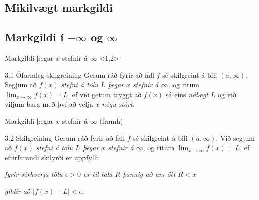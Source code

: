 \documentclass[icelandic,a4paper,12pt]{article}
\begin{document}
\begin{frame}
	\maketitle
\end{frame}

\subsection*{Mikilvægt markgildi}



\subsection*{Markgildi í $-\infty$ og $\infty$}
\begin{frame}{Markgildi þegar $x$ stefnir á $\infty$}
  {<1,2>}
\pause
 \begin{block}{3.1 Óformleg skilgreining}
 Gerum ráð fyrir að fall $f$ sé
skilgreint á bili $(a, \infty)$.  Segjum að  $f(x)$
{\it stefni á tölu $L$ þegar $x$ stefnir á $\infty$}, og ritum
$\lim_{x\rightarrow \infty} f(x)=L$, ef við getum tryggt að  $f(x)$ sé eins
{\em nálægt}
$L$ og við viljum bara með því að velja $x$ {\em nógu stórt}.
 \end{block}
\end{frame}

\begin{frame}{Markgildi þegar $x$ stefnir á $\infty$ (framh)}
\begin{block}{3.2 Skilgreining}
 Gerum ráð fyrir að fall $f$ sé
skilgreint á bili $(a,\infty)$.  Við segjum að $f(x)$
{\it stefni á tölu $L$ þegar $x$ stefnir á $\infty$}, og ritum
$\lim_{x\rightarrow \infty} f(x)=L$, ef eftirfarandi skilyrði er uppfyllt

{\it fyrir sérhverja tölu $\epsilon>0$ er til tala $R$ þannig
  að um öll $R<x$ } 

{\em gildir að  $|f(x)-L|<\epsilon$.}
\end{block}
\end{frame}
\end{document}
